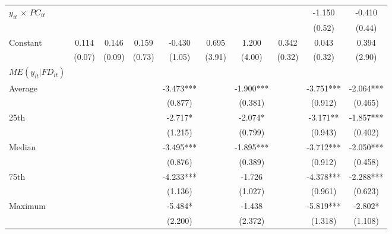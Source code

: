 \documentclass[12pt, a4paper]{article}
\begin{document}
\begin{appendices}
\begin{table}[htbp]
\begin{threeparttable}
{\begin{tabular}{l*{9}{c}}
				$y_{it}$ $\times$ $PC_{it}$ &                     &                     &                     &                     &                     &                     &                     &      -1.150\sym{*}  &      -0.410         \\
				&                     &                     &                     &                     &                     &                     &                     &      (0.52)         &      (0.44)         \\
				Constant            &       0.114         &       0.146         &       0.159         &      -0.430         &       0.695         &       1.200         &       0.342         &       0.043         &       0.394         \\
				&      (0.07)         &      (0.09)         &      (0.73)         &      (1.05)         &      (3.91)         &      (4.00)         &      (0.32)         &      (0.32)         &      (2.90)         \\
				\hline
				$ME(y_{it}|FD_{it})$ \\
				Average&&&&	-3.473***&&		-1.900***	&&		-3.751***	&	-2.064***\\
				&&&&	(0.877)   &&			(0.381)  &&	 		(0.912)   &		(0.465)   \\
				
				25th &&&&		-2.717*  	&&		-2.074*  &&			-3.171** 	&	-1.857***\\
				&&&&	(1.215)	&&		(0.799)   &&			(0.943)   	&	(0.402)   \\
				
				Median&&&&		-3.495***&&			-1.895***	&&		-3.712***&		-2.050***\\
				&&&&	(0.876)   &&			(0.389)  &&	 		(0.912)  & 		(0.458)   \\
				
				75th &&&&		-4.233***	&&		-1.726	&&		-4.378***	&	-2.288***\\
				&&&&	(1.136)	&&		(1.027)	&&		(0.961)   &		(0.623)   \\
				
				Maximum&&&&		-5.484*  &&			-1.438	&&		-5.819***&		-2.802*  \\
				&&&&	(2.200)	&&		(2.372)	&&		(1.318)   &		(1.108)   \\
				

\end{tabular}}
\end{threeparttable}
\end{table}
\end{appendices}
\end{document}
